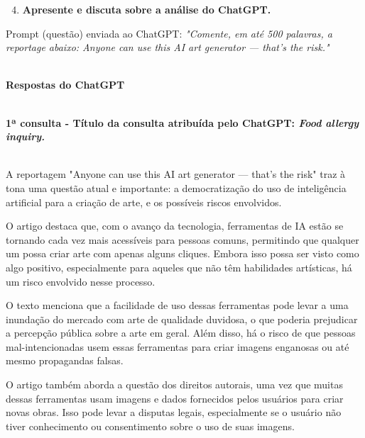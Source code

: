 \begin{enumerate}\setcounter{enumi}{3}\bfseries
    \item  \textbf{Apresente e discuta sobre a análise do ChatGPT.}
\end{enumerate}


Prompt  (questão) enviada ao ChatGPT: 
\textit{"Comente, em até 500 palavras, a reportage abaixo: Anyone can use this AI art generator — that's the risk."}

~\\ 

\textbf{Respostas do ChatGPT}

~\\ 

\textbf{1ª consulta - Título da consulta atribuída pelo ChatGPT: \textit{Food allergy inquiry.}}

~\\ 

A reportagem "Anyone can use this AI art generator — that's the risk" traz à tona uma questão atual e importante: 
a democratização do uso de inteligência artificial para a criação de arte, e os possíveis riscos envolvidos.

O artigo destaca que, com o avanço da tecnologia, ferramentas de IA estão se tornando cada vez mais
acessíveis para pessoas comuns, permitindo que qualquer um possa criar arte com apenas alguns cliques.
Embora isso possa ser visto como algo positivo, especialmente para aqueles que não têm habilidades artísticas,
há um risco envolvido nesse processo.

O texto menciona que a facilidade de uso dessas ferramentas pode levar a uma inundação do mercado com 
arte de qualidade duvidosa, o que poderia prejudicar a percepção pública sobre a arte em geral. 
Além disso, há o risco de que pessoas mal-intencionadas usem essas ferramentas para criar imagens 
enganosas ou até mesmo propagandas falsas.

O artigo também aborda a questão dos direitos autorais, uma vez que muitas dessas ferramentas usam imagens e 
dados fornecidos pelos usuários para criar novas obras. Isso pode levar a disputas legais, 
especialmente se o usuário não tiver conhecimento ou consentimento sobre o uso de suas imagens.

